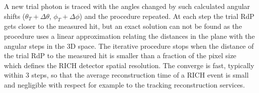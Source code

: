 A new trial photon is traced with the angles changed by such calculated angular shifts ($\theta_T + \Delta \theta$, $\phi_T + \Delta \phi$) and the procedure repeated. At each step the trial RdP gets closer to the measured hit, but an exact solution can not be found as the procedure uses a linear approximation relating the distances in the \MaPMT plane with the angular steps in the 3D space. The iterative procedure stops when the distance of the trial RdP to the measured hit is smaller than a fraction of the \MaPMT pixel size which defines the RICH detector spatial resolution. The converge is fast, typically within 3 steps, so that the average reconstruction time of a RICH event is small and negligible with respect for example to the tracking reconstruction services.


